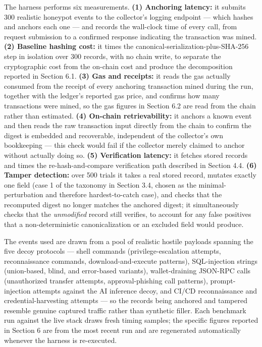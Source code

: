 \documentclass[journal]{IEEEtran}
\begin{document}
The harness performs six measurements. \textbf{(1) Anchoring latency:} it submits 300 realistic honeypot events to the collector's logging endpoint --- which hashes and anchors each one --- and records the wall-clock time of every call, from request submission to a confirmed response indicating the transaction was mined. \textbf{(2) Baseline hashing cost:} it times the canonical-serialization-plus-SHA-256 step in isolation over 300 records, with no chain write, to separate the cryptographic cost from the on-chain cost and produce the decomposition reported in Section 6.1. \textbf{(3) Gas and receipts:} it reads the gas actually consumed from the receipt of every anchoring transaction mined during the run, together with the ledger's reported gas price, and confirms how many transactions were mined, so the gas figures in Section 6.2 are read from the chain rather than estimated. \textbf{(4) On-chain retrievability:} it anchors a known event and then reads the raw transaction input directly from the chain to confirm the digest is embedded and recoverable, independent of the collector's own bookkeeping --- this check would fail if the collector merely claimed to anchor without actually doing so. \textbf{(5) Verification latency:} it fetches stored records and times the re-hash-and-compare verification path described in Section 4.4. \textbf{(6) Tamper detection:} over 500 trials it takes a real stored record, mutates exactly one field (case 1 of the taxonomy in Section 3.4, chosen as the minimal-perturbation and therefore hardest-to-catch case), and checks that the recomputed digest no longer matches the anchored digest; it simultaneously checks that the \emph{unmodified} record still verifies, to account for any false positives that a non-deterministic canonicalization or an excluded field would produce.

The events used are drawn from a pool of realistic hostile payloads spanning the five decoy protocols --- shell commands (privilege-escalation attempts, reconnaissance commands, download-and-execute patterns), SQL-injection strings (union-based, blind, and error-based variants), wallet-draining JSON-RPC calls (unauthorized transfer attempts, approval-phishing call patterns), prompt-injection attempts against the AI inference decoy, and CI/CD reconnaissance and credential-harvesting attempts --- so the records being anchored and tampered resemble genuine captured traffic rather than synthetic filler. Each benchmark run against the live stack draws fresh timing samples; the specific figures reported in Section 6 are from the most recent run and are regenerated automatically whenever the harness is re-executed.
\end{document}
